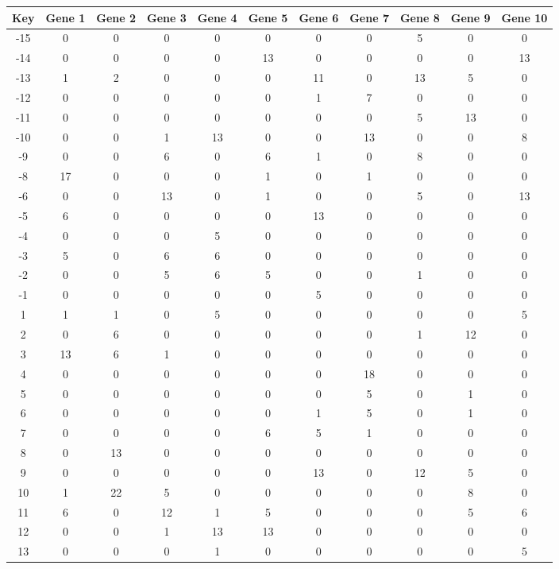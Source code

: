 \begin{tabular}{|c|c|c|c|c|c|c|c|c|c|c|}
\hline
Key & Gene 1 & Gene 2 & Gene 3 & Gene 4 & Gene 5 & Gene 6 & Gene 7 & Gene 8 & Gene 9 & Gene 10 \\
\hline
-15 & 0 & 0 & 0 & 0 & 0 & 0 & 0 & 5 & 0 & 0 \\
-14 & 0 & 0 & 0 & 0 & 13 & 0 & 0 & 0 & 0 & 13 \\
-13 & 1 & 2 & 0 & 0 & 0 & 11 & 0 & 13 & 5 & 0 \\
-12 & 0 & 0 & 0 & 0 & 0 & 1 & 7 & 0 & 0 & 0 \\
-11 & 0 & 0 & 0 & 0 & 0 & 0 & 0 & 5 & 13 & 0 \\
-10 & 0 & 0 & 1 & 13 & 0 & 0 & 13 & 0 & 0 & 8 \\
-9 & 0 & 0 & 6 & 0 & 6 & 1 & 0 & 8 & 0 & 0 \\
-8 & 17 & 0 & 0 & 0 & 1 & 0 & 1 & 0 & 0 & 0 \\
-6 & 0 & 0 & 13 & 0 & 1 & 0 & 0 & 5 & 0 & 13 \\
-5 & 6 & 0 & 0 & 0 & 0 & 13 & 0 & 0 & 0 & 0 \\
-4 & 0 & 0 & 0 & 5 & 0 & 0 & 0 & 0 & 0 & 0 \\
-3 & 5 & 0 & 6 & 6 & 0 & 0 & 0 & 0 & 0 & 0 \\
-2 & 0 & 0 & 5 & 6 & 5 & 0 & 0 & 1 & 0 & 0 \\
-1 & 0 & 0 & 0 & 0 & 0 & 5 & 0 & 0 & 0 & 0 \\
1 & 1 & 1 & 0 & 5 & 0 & 0 & 0 & 0 & 0 & 5 \\
2 & 0 & 6 & 0 & 0 & 0 & 0 & 0 & 1 & 12 & 0 \\
3 & 13 & 6 & 1 & 0 & 0 & 0 & 0 & 0 & 0 & 0 \\
4 & 0 & 0 & 0 & 0 & 0 & 0 & 18 & 0 & 0 & 0 \\
5 & 0 & 0 & 0 & 0 & 0 & 0 & 5 & 0 & 1 & 0 \\
6 & 0 & 0 & 0 & 0 & 0 & 1 & 5 & 0 & 1 & 0 \\
7 & 0 & 0 & 0 & 0 & 6 & 5 & 1 & 0 & 0 & 0 \\
8 & 0 & 13 & 0 & 0 & 0 & 0 & 0 & 0 & 0 & 0 \\
9 & 0 & 0 & 0 & 0 & 0 & 13 & 0 & 12 & 5 & 0 \\
10 & 1 & 22 & 5 & 0 & 0 & 0 & 0 & 0 & 8 & 0 \\
11 & 6 & 0 & 12 & 1 & 5 & 0 & 0 & 0 & 5 & 6 \\
12 & 0 & 0 & 1 & 13 & 13 & 0 & 0 & 0 & 0 & 0 \\
13 & 0 & 0 & 0 & 1 & 0 & 0 & 0 & 0 & 0 & 5 \\
\hline
\end{tabular}